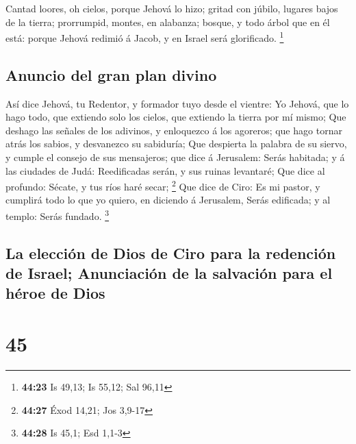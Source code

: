  Cantad loores, oh cielos, porque Jehová lo hizo; gritad
con júbilo, lugares bajos de la tierra; prorrumpid, montes, en alabanza;
bosque, y todo árbol que en él está: porque Jehová redimió á Jacob, y en
Israel será glorificado. \footnote{\textbf{44:23} Is 49,13; Is 55,12;
  Sal 96,11}

\hypertarget{anuncio-del-gran-plan-divino}{%
\subsection{Anuncio del gran plan
divino}\label{anuncio-del-gran-plan-divino}}

 Así dice Jehová, tu Redentor, y formador tuyo desde el
vientre: Yo Jehová, que lo hago todo, que extiendo solo los cielos, que
extiendo la tierra por mí mismo;  Que deshago las señales
de los adivinos, y enloquezco á los agoreros; que hago tornar atrás los
sabios, y desvanezco su sabiduría;  Que despierta la
palabra de su siervo, y cumple el consejo de sus mensajeros; que dice á
Jerusalem: Serás habitada; y á las ciudades de Judá: Reedificadas serán,
y sus ruinas levantaré;  Que dice al profundo: Sécate, y
tus ríos haré secar; \footnote{\textbf{44:27} Éxod 14,21; Jos 3,9-17}
 Que dice de Ciro: Es mi pastor, y cumplirá todo lo que
yo quiero, en diciendo á Jerusalem, Serás edificada; y al templo: Serás
fundado. \footnote{\textbf{44:28} Is 45,1; Esd 1,1-3}

\hypertarget{la-elecciuxf3n-de-dios-de-ciro-para-la-redenciuxf3n-de-israel-anunciaciuxf3n-de-la-salvaciuxf3n-para-el-huxe9roe-de-dios}{%
\subsection{La elección de Dios de Ciro para la redención de Israel;
Anunciación de la salvación para el héroe de
Dios}\label{la-elecciuxf3n-de-dios-de-ciro-para-la-redenciuxf3n-de-israel-anunciaciuxf3n-de-la-salvaciuxf3n-para-el-huxe9roe-de-dios}}

\hypertarget{section-44}{%
\section{45}\label{section-44}}

